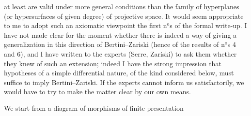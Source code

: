 
at least are valid under more general conditions than  the
family of hyperplanes (or hypersurfaces of given degree) of projective
space. It would seem appropriate to me to adopt such an axiomatic
viewpoint  the first n$^{\text{o}}$s of the formal write-up. I have not
made clear for the moment whether there is indeed a way of giving a generalization
in this direction of Bertini–Zariski (hence of the results of n$^{\text{o}}$s 4 and 6),
and I have written to the experts (Serre, Zariski) to ask them whether they
knew of such an extension; indeed I have the strong impression
that hypotheses of a simple differential nature, of the kind
considered below, must suffice to imply Bertini–Zariski.
If the experts cannot inform us satisfactorily, we
would have to try to make the matter clear by our own means.

We start from a  diagram of morphisms of finite presentation


